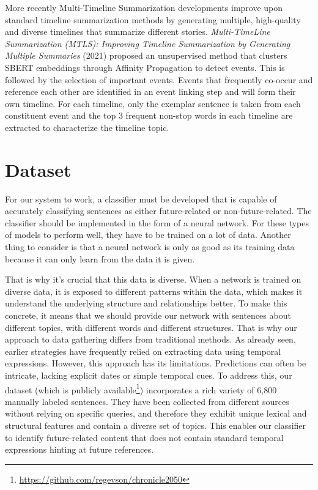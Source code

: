 \documentclass[12pt,oneside,bibtotoc,liststotoc]{scrbook}
\begin{document}
More recently Multi-Timeline Summarization developments improve upon standard timeline summarization methods by generating multiple, high-quality and diverse timelines that summarize different stories. \textit{Multi-TimeLine Summarization (MTLS): Improving Timeline Summarization by Generating Multiple Summaries} (2021) \cite{YuMultiTimeline} proposed an unsupervised method that clusters SBERT embeddings through Affinity Propagation to detect events. This is followed by the selection of important events. Events that frequently co-occur and reference each other are identified in an event linking step and will form their own timeline. For each timeline, only the exemplar sentence is taken from each constituent event and the top 3 frequent non-stop words in each timeline are extracted to characterize the timeline topic.



\chapter{Dataset}
For our system to work, a classifier must be developed that is capable of accurately classifying sentences as either future-related or non-future-related. The classifier should be implemented in the form of a neural network. For these types of models to perform well, they have to be trained on a lot of data. Another thing to consider is that a neural network is only as good as its training data because it can only learn from the data it is given.

That is why it's crucial that this data is diverse. When a network is trained on diverse data, it is exposed to different patterns within the data, which makes it understand the underlying structure and relationships better. \cite{GoodfellowDeepLearning} To make this concrete, it means that we should provide our network with sentences about different topics, with different words and different structures. That is why our approach to data gathering differs from traditional methods. As already seen, earlier strategies have frequently relied on extracting data using temporal expressions. However, this approach has its limitations. Predictions can often be intricate, lacking explicit dates or simple temporal cues. To address this, our dataset (which is publicly available\footnote{\url{https://github.com/regevson/chronicle2050}}) incorporates a rich variety of 6,800 manually labeled sentences. They have been collected from different sources without relying on specific queries, and therefore they exhibit unique lexical and structural features and contain a diverse set of topics. This enables our classifier to identify future-related content that does not contain standard temporal expressions hinting at future references.
\end{document}
